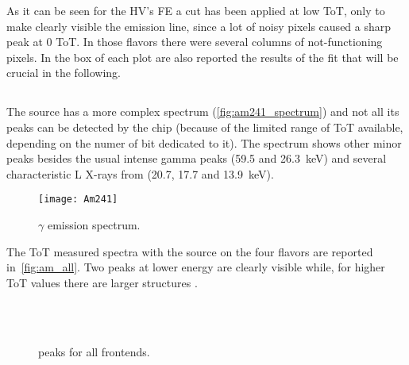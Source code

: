 As it can be seen for the HV's FE a cut has been applied at low ToT, only to make clearly visible the emission line, since a lot of noisy pixels caused a sharp peak at 0 ToT. In those flavors there were several columns of not-functioning pixels. In the box of each plot are also reported the results of the fit that will be crucial in the following.


\subsection{}


The  source has a more complex spectrum (\autoref{fig:am241_spectrum}) and not all its peaks can be detected by the chip (because of the limited range of ToT available, depending on the numer of bit dedicated to it). The spectrum shows other minor peaks besides the usual intense gamma peaks (59.5 and \SI{26.3}{keV}) and several characteristic L X-rays from  (20.7, 17.7 and \SI{13.9}{keV}).\\ 

\begin{figure}[h!]
\centering
\texttt{[image: Am241]}
\caption{ $\gamma$ emission spectrum.}
\label{fig:am241_spectrum}
\end{figure}

The ToT measured spectra with the  source on the four flavors are reported in~\autoref{fig:am_all}. Two peaks at lower energy are clearly visible while, for higher ToT values there are larger structures .

\begin{figure}[h!]
\centering
{}\quad
{}\\
\quad
{}\\
\caption{ peaks for all frontends.}
\label{fig:am_all}
\end{figure}

